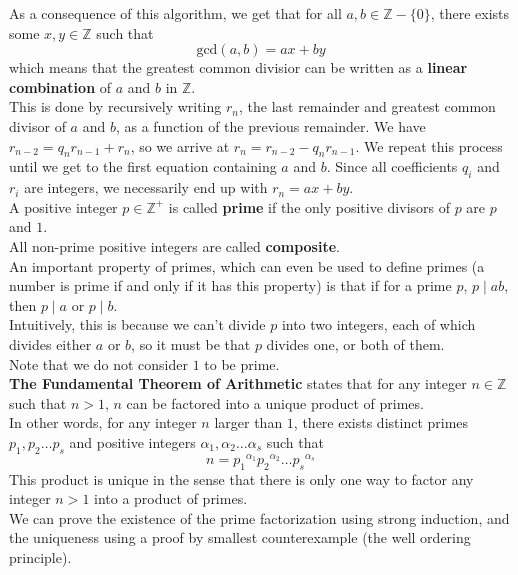 \documentclass[12pt]{article}
\newcommand{\Z}{\mathbb{Z}}
\begin{document}
    As a consequence of this algorithm,
    we get that for all $a, b \in \Z - \{0\}$,
    there exists some $x, y \in \Z$ such that
    \[ \text{gcd}(a, b) = ax + by \] 
    which means that the greatest common divisior can be written
    as a \textbf{linear combination} of $a$ and $b$ in $\Z$. \\
    This is done by recursively writing $r_n$,
    the last remainder and greatest common divisor of $a$ and $b$,
    as a function of the previous remainder.
    We have $ r_{n-2} = q_{n}r_{n-1} + r_{n}$,
    so we arrive at $r_{n} = r_{n-2} - q_{n}r_{n-1}$.
    We repeat this process until we get to the first equation
    containing $a$ and $b$.
    Since all coefficients $q_i$ and $r_i$ are integers,
    we necessarily end up with $r_n = ax + by$. \\

    A positive integer $p \in \Z^+$ is called \textbf{prime}
    if the only positive divisors of $p$ are $p$ and $1$. \\
    All non-prime positive integers are called \textbf{composite}. \\
    An important property of primes,
    which can even be used to define primes
    (a number is prime if and only if it has this property)
    is that if for a prime $p$, $p \mid ab$,
    then $p \mid a$ or $p \mid b$. \\
    Intuitively, this is because we can't divide $p$
    into two integers, each of which divides either $a$ or $b$,
    so it must be that $p$ divides one, or both of them. \\
    Note that we do not consider $1$ to be prime. \\

    \textbf{The Fundamental Theorem of Arithmetic}
    states that for any integer $n \in \Z$ such that $n > 1$,
    $n$ can be factored into a unique product of primes. \\
    In other words, for any integer $n$ larger than $1$,
    there exists distinct primes $p_1, p_2 \dots p_s$
    and positive integers $\alpha_1, \alpha_2 \dots \alpha_s$
    such that
    \[ n = {p_1}^{\alpha_1}{p_2}^{\alpha_2} \dots {p_s}^{\alpha_s} \]
    This product is unique in the sense that there is only
    one way to factor any integer $n > 1$ into a product of primes. \\
    We can prove the existence of the prime factorization
    using strong induction,
    and the uniqueness using a proof by smallest counterexample
    (the well ordering principle). \\
\end{document}
